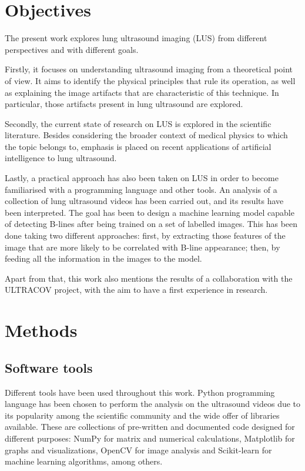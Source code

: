 \documentclass[12pt]{article} %
\begin{document}
\section{Objectives}

	The present work explores lung ultrasound imaging (LUS) from different perspectives and with different goals.

	Firstly, it focuses on understanding ultrasound imaging from a theoretical point of view. It aims to identify the physical principles that rule its operation, as well as explaining the image artifacts that are characteristic of this technique. In particular, those artifacts present in lung ultrasound are explored.
	
	Secondly, the current state of research on LUS is explored in the scientific literature. Besides considering the broader context of medical physics to which the topic belongs to, emphasis is placed on recent applications of artificial intelligence to lung ultrasound.

	Lastly, a practical approach has also been taken on LUS in order to become familiarised with a programming language and other tools. An analysis of a collection of lung ultrasound videos has been carried out, and its results have been interpreted. The goal has been to design a machine learning model capable of detecting B-lines after being trained on a set of labelled images. This has been done taking two different approaches: first, by extracting those features of the image that are more likely to be correlated with B-line appearance; then, by feeding all the information in the images to the model.
	
	Apart from that, this work also mentions the results of a collaboration with the ULTRACOV project, with the aim to have a first experience in research.
	
	
\section{Methods}

\subsection{Software tools}
	Different tools have been used throughout this work. Python programming language has been chosen to perform the analysis on the ultrasound videos due to its popularity among the scientific community and the wide offer of libraries available. These are collections of pre-written and documented code designed for different purposes: NumPy\cite{numpy} for matrix and numerical calculations, Matplotlib\cite{matplotlib} for graphs and visualizations, OpenCV\cite{opencv} for image analysis and Scikit-learn\cite{sklearn} for machine learning algorithms, among others.
\end{document}
